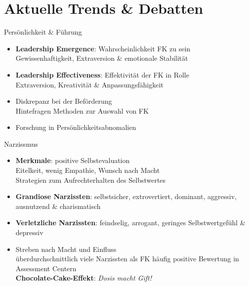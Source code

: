 \documentclass{cheatsheet}
\begin{document}
    \section{Aktuelle Trends \& Debatten}
    \begin{sectionbox}{Persönlichkeit \& Führung}
        \begin{itemize}
            \item \textbf{Leadership Emergence}: Wahrscheinlichkeit FK zu sein\\
            \ra Gewissenhaftigkeit, Extraversion \&  emotionale Stabilität
            \item \textbf{Leadership Effectiveness}: Effektivität der FK in Rolle\\
            \ra Extraversion, Kreativität \& Anpassungsfähigkeit 
            \item Diskrepanz bei der Beförderung\\
            \ra Hintefragen Methoden zur Auswahl von FK
            \item Forschung in Persönlichkeitsabnomalien
        \end{itemize}
    \end{sectionbox}
    \begin{hintbox}{Narzissmus}
        \begin{itemize}
            \item \textbf{Merkmale}:  positive Selbstevaluation\\
            \ra Eitelkeit, wenig Empathie, Wunsch nach Macht\\
            \ra Strategien zum Aufrechterhalten des Selbstwertes
            \item \textbf{Grandiose Narzissten}: selbstsicher, extrovertiert, dominant, aggressiv, ausnutzend \& charismatisch
            \item \textbf{Verletzliche Narzissten}: feindselig, arrogant, geringes Selbstwertgefühl \& depressiv
            \item Streben nach Macht und Einfluss\\
            \ra überdurchschnittlich viele Narzissten als FK
            \ra häufig positive Bewertung in Assessment Centern\\
            \ra \textbf{Chocolate-Cake-Effekt}: \emph{Dosis macht Gift!}
        \end{itemize}
    \end{hintbox}
\end{document}

